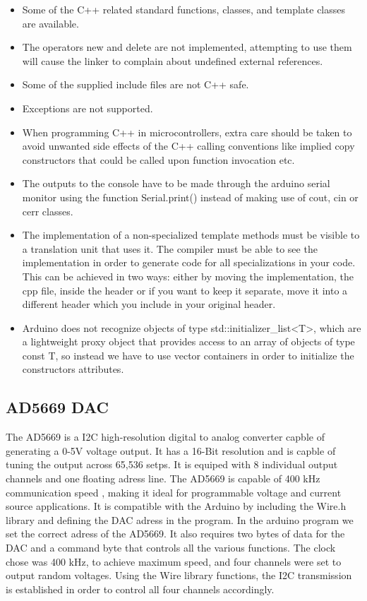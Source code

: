 \begin{refsection}
	    \begin{itemize}
	    	\item Some of the C++ related standard functions, classes, and template classes are available.
	    	\item The operators new and delete are not implemented, attempting to use them will cause the linker to complain about undefined external references.
	    	\item Some of the supplied include files are not C++ safe.
	    	\item Exceptions are not supported.
	    	\item When programming C++ in microcontrollers, extra care should be taken to avoid unwanted side effects of the C++ calling conventions like implied copy constructors that could be called upon function invocation etc.
	    	\item The outputs to the console have to be made through the arduino serial monitor using the function Serial.print() instead of making use of cout, cin or cerr classes.
	    	\item  The implementation of a non-specialized template methods must be visible to a translation unit that uses it. The compiler must be able to see the implementation in order to generate code for all specializations in your code. This can be achieved in two ways: either by moving the implementation, the cpp file, inside the header or if you want to keep it separate, move it into a different header which you include in your original header.
	    	\item Arduino does not recognize objects of type std::initializer\_list<T>, which are a lightweight proxy object that provides access to an array of objects of type const T, so instead we have to use vector containers in order to initialize the constructors attributes.
	\end{itemize}

	\subsection{AD5669 DAC}
	The AD5669 is a I2C high-resolution digital to analog converter capble of generating a 0-5V voltage output. It has a 16-Bit resolution and is capble of tuning the output across 65,536 setps. It is equiped with 8 individual output channels and one floating adress line. The AD5669 is capable of 400 kHz communication speed , making it ideal for programmable voltage and current source applications. It is compatible with the Arduino by including the Wire.h library and defining the DAC adress in the program.
	In the arduino program we set the correct adress of the AD5669. It also requires two bytes of data for the DAC and a command byte that controls all the various functions. The clock chose was 400 kHz, to achieve maximum speed, and four channels were set to output random voltages. Using the Wire library functions, the I2C transmission is established in order to control all four channels accordingly.
	

\end{refsection}
